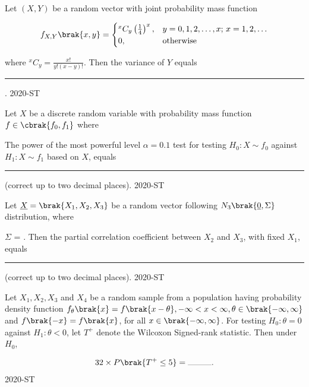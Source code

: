\item Let $ (X, Y) $ be a random vector with joint probability mass function

\begin{align*}
f_{X,Y}\brak{x,y} = 
\begin{cases} 
{}^x C_y \left( \frac{1}{4} \right)^x, & y = 0, 1, 2, \ldots, x; \, x = 1, 2, \ldots \\
0, & \text{otherwise}
\end{cases}
\end{align*}

where $ {}^x C_y = \frac{x!}{y!(x - y)!} $. Then the variance of $ Y $ equals \rule{1cm}{0.2pt}.
\hfill{2020-ST}


\item Let $X$ be a discrete random variable with probability mass function $f \in \cbrak{f_0, f_1}$ where
	\begin{table}[ht]
		\centering
		
	\end{table}
      The power of the most powerful level $\alpha = 0.1$ test for testing $
	H_0 : X \sim f_0$ against $H_1 : X \sim f_1$ based on $X$, equals \rule{1cm}{0.2pt} (correct up to two decimal places).
\hfill{2020-ST}


\item Let $ \underline{X} = \brak{X_1, X_2, X_3} $ be a random vector following $ N_{3}\brak{\underline{0}, \Sigma} $ distribution, where


$\Sigma$ = . Then the partial correlation coefficient between $ X_2 $ and $ X_3 $, with fixed $ X_1 $, equals \rule{1cm}{0.2pt} (correct up to two decimal places).
\hfill{2020-ST}


\item Let $ X_1, X_2, X_3 $ and $ X_4 $ be a random sample from a population having probability density function $ f_\theta\brak{x} = f\brak{x - \theta}, -\infty < x < \infty, \theta \in \brak{-\infty, \infty} $ and $ f\brak{-x} = f\brak{x} $, for all $ x \in \brak{-\infty, \infty} $. For testing $ H_0 : \theta = 0 $ against $ H_1 : \theta < 0 $, let $ T^+ $ denote the Wilcoxon Signed-rank statistic. Then under $ H_0 $,

	\begin{align*}
		32 \times P\brak{T^+ \leq 5} = \rule{1cm}{0.2pt}.
	\end{align*}
\hfill{2020-ST}


